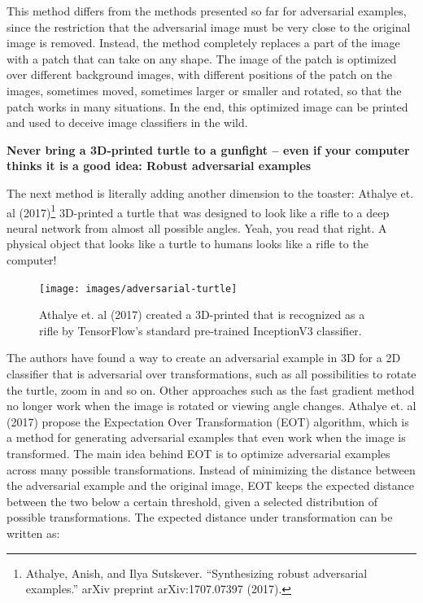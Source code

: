 \documentclass[
  12pt,
]{krantz}
\begin{document}
This method differs from the methods presented so far for adversarial examples, since the restriction that the adversarial image must be very close to the original image is removed.
Instead, the method completely replaces a part of the image with a patch that can take on any shape.
The image of the patch is optimized over different background images, with different positions of the patch on the images, sometimes moved, sometimes larger or smaller and rotated, so that the patch works in many situations.
In the end, this optimized image can be printed and used to deceive image classifiers in the wild.

\textbf{Never bring a 3D-printed turtle to a gunfight -- even if your computer thinks it is a good idea: Robust adversarial examples}

The next method is literally adding another dimension to the toaster:
Athalye et. al (2017)\footnote{Athalye, Anish, and Ilya Sutskever. ``Synthesizing robust adversarial examples.'' arXiv preprint arXiv:1707.07397 (2017).} 3D-printed a turtle that was designed to look like a rifle to a deep neural network from almost all possible angles.
Yeah, you read that right.
A physical object that looks like a turtle to humans looks like a rifle to the computer!

\begin{figure}

{\centering \texttt{[image: images/adversarial-turtle]} 

}

\caption{Athalye et. al (2017) created a 3D-printed that is recognized as a rifle by TensorFlow’s standard pre-trained InceptionV3 classifier.}\label{fig:adversarial-turtle}
\end{figure}

The authors have found a way to create an adversarial example in 3D for a 2D classifier that is adversarial over transformations, such as all possibilities to rotate the turtle, zoom in and so on.
Other approaches such as the fast gradient method no longer work when the image is rotated or viewing angle changes.
Athalye et. al (2017) propose the Expectation Over Transformation (EOT) algorithm, which is a method for generating adversarial examples that even work when the image is transformed.
The main idea behind EOT is to optimize adversarial examples across many possible transformations.
Instead of minimizing the distance between the adversarial example and the original image, EOT keeps the expected distance between the two below a certain threshold, given a selected distribution of possible transformations.
The expected distance under transformation can be written as:
\end{document}
